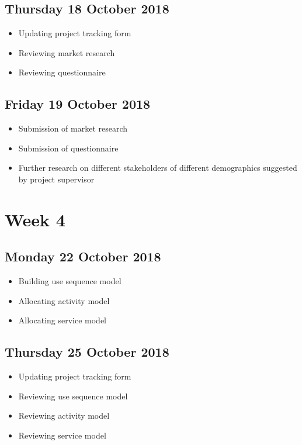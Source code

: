 \subsection*{Thursday 18 October 2018}
\begin{itemize}
	\item Updating project tracking form
	\item Reviewing market research
	\item Reviewing questionnaire
\end{itemize}

\subsection*{Friday 19 October 2018}
\begin{itemize}
	\item Submission of market research
	\item Submission of questionnaire
	\item Further research on different stakeholders of different demographics suggested by project supervisor
\end{itemize}

\section*{Week 4}
\subsection*{Monday 22 October 2018}
\begin{itemize}
	\item Building use sequence model
	\item Allocating activity model
	\item Allocating service model
\end{itemize}

\subsection*{Thursday 25 October 2018}
\begin{itemize}
	\item Updating project tracking form
	\item Reviewing use sequence model
	\item Reviewing activity model
	\item Reviewing service model 
\end{itemize}

